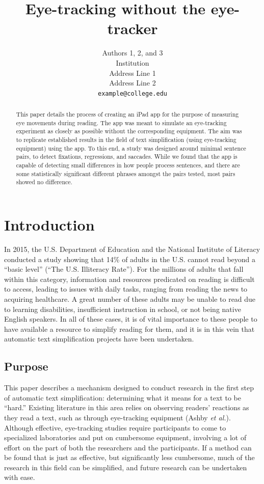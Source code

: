 \documentclass[11pt,letterpaper]{article}
\title{Eye-tracking without the eye-tracker
	}
\author{Authors 1, 2, and 3\\
	Institution\\
	Address Line 1\\
	Address Line 2\\
	{\tt example@college.edu}}
\date{}
\begin{document}
	\maketitle
	\begin{abstract}
		This paper details the process of creating an iPad app for the purpose of measuring eye movements during reading. The app was meant to simulate an eye-tracking experiment as closely as possible without the corresponding equipment. The aim was to replicate established results in the field of text simplification (using eye-tracking equipment) using the app. To this end, a study was designed around minimal sentence pairs, to detect fixations, regressions, and saccades. While we found that the app is capable of detecting small differences in how people process sentences, and there are some statistically significant different phrases amongst the pairs tested, most pairs showed no difference.
	\end{abstract}
	
	\section{Introduction}
	
	In 2015, the U.S. Department of Education and the National Institute of Literacy conducted a study showing that 14\% of adults in the U.S. cannot read beyond a ``basic level'' (``The U.S. Illiteracy Rate''). For the millions of adults that fall within this category, information and resources predicated on reading is difficult to access, leading to issues with daily tasks, ranging from reading the news to acquiring healthcare. A great number of these adults may be unable to read due to learning disabilities, insufficient instruction in school, or not being native English speakers. In all of these cases, it is of vital importance to these people to have available a resource to simplify reading for them, and it is in this vein that automatic text simplification projects have been undertaken.
	
	\subsection{Purpose}
	
	This paper describes a mechanism designed to conduct research in the first step of automatic text simplification: determining what it means for a text to be ``hard.'' Existing literature in this area relies on observing readers' reactions as they read a text, such as through eye-tracking equipment (Ashby \textit{et al.}). Although effective, eye-tracking studies require participants to come to specialized laboratories and put on cumbersome equipment, involving a lot of effort on the part of both the researchers and the participants. If a method can be found that is just as effective, but significantly less cumbersome, much of the research in this field can be simplified, and future research can be undertaken with ease.
	
\end{document}
